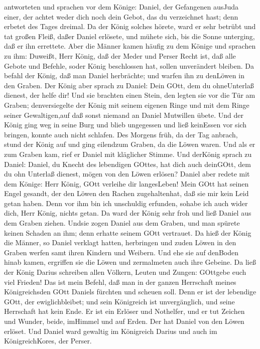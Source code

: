 antworteten und sprachen vor dem Könige: Daniel, der Gefangenen ausJuda
einer, der achtet weder dich noch dein Gebot, das du verzeichnet hast;
denn erbetet des Tages dreimal.  Da der König solches
hörete, ward er sehr betrübt und tat großen Fleiß, daßer Daniel
erlösete, und mühete sich, bis die Sonne unterging, daß er ihn
errettete.  Aber die Männer kamen häufig zu dem Könige und
sprachen zu ihm: Duweißt, Herr König, daß der Meder und Perser Recht
ist, daß alle Gebote und Befehle, soder König beschlossen hat, sollen
unverändert bleiben.  Da befahl der König, daß man Daniel
herbrächte; und warfen ihn zu denLöwen in den Graben. Der König aber
sprach zu Daniel: Dein GOtt, dem du ohneUnterlaß dienest, der helfe dir!
 Und sie brachten einen Stein, den legten sie vor die Tür
am Graben; denversiegelte der König mit seinem eigenen Ringe und mit dem
Ringe seiner Gewaltigen,auf daß sonst niemand an Daniel Mutwillen übete.
 Und der König ging weg in seine Burg und blieb ungegessen
und ließ keinEssen vor sich bringen, konnte auch nicht schlafen.
 Des Morgens früh, da der Tag anbrach, stund der König auf
und ging eilendzum Graben, da die Löwen waren.  Und als er
zum Graben kam, rief er Daniel mit kläglicher Stimme. Und derKönig
sprach zu Daniel: Daniel, du Knecht des lebendigen GOttes, hat dich auch
deinGOtt, dem du ohn Unterlaß dienest, mögen von den Löwen erlösen?
 Daniel aber redete mit dem Könige: Herr König, GOtt
verleihe dir langesLeben!  Mein GOtt hat seinen Engel
gesandt, der den Löwen den Rachen zugehaltenhat, daß sie mir kein Leid
getan haben. Denn vor ihm bin ich unschuldig erfunden, sohabe ich auch
wider dich, Herr König, nichts getan.  Da ward der König
sehr froh und ließ Daniel aus dem Graben ziehen. Undsie zogen Daniel aus
dem Graben, und man spürete keinen Schaden an ihm; denn erhatte seinem
GOtt vertrauet.  Da hieß der König die Männer, so Daniel
verklagt hatten, herbringen und zuden Löwen in den Graben werfen samt
ihren Kindern und Weibern. Und ehe sie auf denBoden hinab kamen,
ergriffen sie die Löwen und zermalmeten auch ihre Gebeine. 
Da ließ der König Darius schreiben allen Völkern, Leuten und Zungen:
GOttgebe euch viel Frieden!  Das ist mein Befehl, daß man
in der ganzen Herrschaft meines Königreichsden GOtt Daniels fürchten und
scheuen soll. Denn er ist der lebendige GOtt, der ewiglichbleibet; und
sein Königreich ist unvergänglich, und seine Herrschaft hat kein Ende.
 Er ist ein Erlöser und Nothelfer, und er tut Zeichen und
Wunder, beide, imHimmel und auf Erden. Der hat Daniel von den Löwen
erlöset.  Und Daniel ward gewaltig im Königreich Darius und
auch im KönigreichKores, der Perser.

